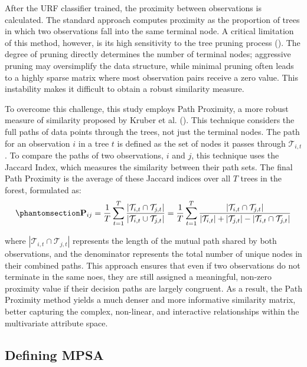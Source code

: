 \documentclass[
  a4paper,
  12pt]{article}
\begin{document}
After the URF classifier trained, the proximity between observations is
calculated. The standard approach computes proximity as the proportion
of trees in which two observations fall into the same terminal node. A
critical limitation of this method, however, is its high sensitivity to
the tree pruning process (). The degree of pruning directly determines the number of terminal
nodes; aggressive pruning may oversimplify the data structure, while
minimal pruning often leads to a highly sparse matrix where most
observation pairs receive a zero value. This instability makes it
difficult to obtain a robust similarity measure.

To overcome this challenge, this study employs Path Proximity, a more
robust measure of similarity proposed by Kruber et al.
(). This technique considers the full
paths of data points through the trees, not just the terminal nodes. The
path for an observation \(i\) in a tree \(t\) is defined as the set of
nodes it passes through \(\mathcal{T}_{i, t}\). To compare the paths of
two observations, \(i\) and \(j\), this technique uses the Jaccard
Index, which measures the similarity between their path sets. The final
Path Proximity is the average of these Jaccard indices over all \(T\)
trees in the forest, formulated as:
\begin{equation}\phantomsection\label{eq-path-proximity-jaccard}{
\mathbf{P}_{ij} = \frac{1}{T} \sum_{t=1}^{T} \frac{|\mathcal{T}_{i,t} \cap \mathcal{T}_{j,t}|}{|\mathcal{T}_{i,t} \cup \mathcal{T}_{j,t}|} = \frac{1}{T} \sum_{t=1}^{T} \frac{|\mathcal{T}_{i,t} \cap \mathcal{T}_{j,t}|}{|\mathcal{T}_{i,t}| + |\mathcal{T}_{j,t}| - |\mathcal{T}_{i,t} \cap \mathcal{T}_{j,t}|}
}\end{equation}

where \(|\mathcal{T}_{i, t}\cap \mathcal{T}_{j, t}|\) represents the
length of the mutual path shared by both observations, and the
denominator represents the total number of unique nodes in their
combined paths. This approach ensures that even if two observations do
not terminate in the same noes, they are still assigned a meaningful,
non-zero proximity value if their decision paths are largely congruent.
As a result, the Path Proximity method yields a much denser and more
informative similarity matrix, better capturing the complex, non-linear,
and interactive relationships within the multivariate attribute space.

\subsection{Defining MPSA}\label{defining-mpsa}
\end{document}
